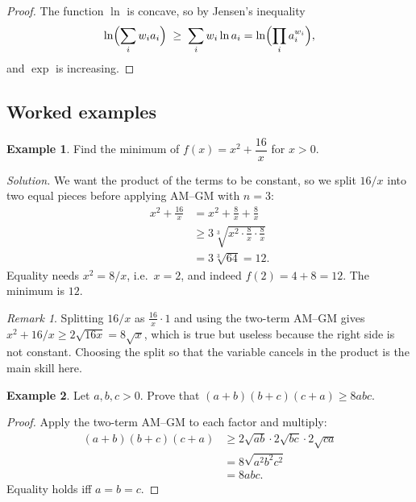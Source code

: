 \documentclass[11pt,a4paper]{article}
\theoremstyle{definition}
\newtheorem{example}{Example}[section]
\theoremstyle{remark}
\newtheorem*{remark}{Remark}
\begin{document}
\begin{proof}
The function $\ln$ is concave, so by Jensen's inequality
\[
  \ln\Bigl(\sum_{i} w_i a_i\Bigr) \;\geq\; \sum_i w_i \ln a_i = \ln\Bigl(\prod_i a_i^{w_i}\Bigr),
\]
and $\exp$ is increasing.
\end{proof}

\subsection{Worked examples}

\begin{example}\label{ex:minimize}
Find the minimum of $f(x) = x^2 + \dfrac{16}{x}$ for $x > 0$.
\end{example}

\noindent\textit{Solution.} We want the product of the terms to be constant, so we split $16/x$ into two equal pieces before applying AM--GM with $n = 3$:
\begin{align*}
  x^2 + \frac{16}{x}
    &= x^2 + \frac{8}{x} + \frac{8}{x} \\
    &\geq 3\sqrt[3]{x^2 \cdot \frac{8}{x} \cdot \frac{8}{x}} \\
    &= 3\sqrt[3]{64} = 12.
\end{align*}
Equality needs $x^2 = 8/x$, i.e.\ $x = 2$, and indeed $f(2) = 4 + 8 = 12$. The minimum is $12$.

\begin{remark}
Splitting $16/x$ as $\tfrac{16}{x} \cdot 1$ and using the two-term AM--GM gives $x^2 + 16/x \geq 2\sqrt{16x} = 8\sqrt{x}$, which is true but useless because the right side is not constant. Choosing the split so that the variable cancels in the product is the main skill here.
\end{remark}

\begin{example}\label{ex:product8}
Let $a, b, c > 0$. Prove that $(a + b)(b + c)(c + a) \geq 8abc$.
\end{example}

\begin{proof}
Apply the two-term AM--GM to each factor and multiply:
\begin{align*}
  (a + b)(b + c)(c + a)
    &\geq 2\sqrt{ab} \cdot 2\sqrt{bc} \cdot 2\sqrt{ca} \\
    &= 8\sqrt{a^2 b^2 c^2} \\
    &= 8abc.
\end{align*}
Equality holds iff $a = b = c$.
\end{proof}
\end{document}
